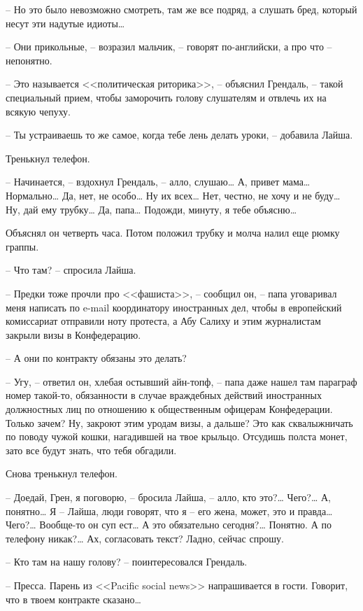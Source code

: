 -- Но это было невозможно смотреть, там же все подряд, а слушать бред, который несут эти надутые идиоты\ldots{}

-- Они прикольные, -- возразил мальчик, -- говорят по-английски, а про что -- непонятно.

-- Это называется <<политическая риторика>>, -- объяснил Грендаль, -- такой специальный прием, чтобы заморочить голову слушателям и отвлечь их на всякую чепуху.

-- Ты устраиваешь то же самое, когда тебе лень делать уроки, -- добавила Лайша.

Тренькнул телефон.

-- Начинается, -- вздохнул Грендаль, -- алло, слушаю\ldots{} А, привет мама\ldots{} Нормально\ldots{} Да, нет, не особо\ldots{} Ну их всех\ldots{} Нет, честно, не хочу и не буду\ldots{} Ну, дай ему трубку\ldots{} Да, папа\ldots{} Подожди, минуту, я тебе объясню\ldots{}

Объяснял он четверть часа. Потом положил трубку и молча налил еще рюмку граппы.

-- Что там? -- спросила Лайша.

-- Предки тоже прочли про <<фашиста>>, -- сообщил он, -- папа уговаривал меня написать по e-mail координатору иностранных дел, чтобы в европейский комиссариат отправили ноту протеста, а Абу Салиху и этим журналистам закрыли визы в Конфедерацию.

-- А они по контракту обязаны это делать?

-- Угу, -- ответил он, хлебая остывший айн-топф, -- папа даже нашел там параграф номер такой-то, обязанности в случае враждебных действий иностранных должностных лиц по отношению к общественным офицерам Конфедерации. Только зачем? Ну, закроют этим уродам визы, а дальше? Это как сквалыжничать по поводу чужой кошки, нагадившей на твое крыльцо. Отсудишь полста монет, зато все будут знать, что тебя обгадили.

Снова тренькнул телефон.

-- Доедай, Грен, я поговорю, -- бросила Лайша, -- алло, кто это?\ldots{} Чего?\ldots{} А, понятно\ldots{} Я -- Лайша, люди говорят, что я -- его жена, может, это и правда\ldots{} Чего?\ldots{} Вообще-то он суп ест\ldots{} А это обязательно сегодня?\ldots{} Понятно. А по телефону никак?\ldots{} Ах, согласовать текст? Ладно, сейчас спрошу.

-- Кто там на нашу голову? -- поинтересовался Грендаль.

-- Пресса. Парень из <<Pacific social news>> напрашивается в гости. Говорит, что в твоем контракте сказано\ldots{}

